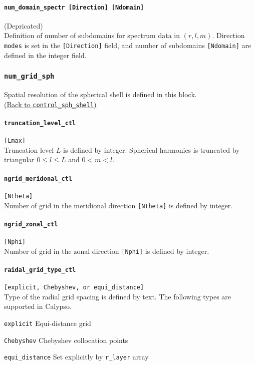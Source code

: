 \paragraph{\color{magenta} \tt num\_domain\_spectr    [Direction]    [Ndomain]}
\label{href_t:num_domain_spectr}
{\color{magenta} (Depricated)}\\
Definition of number of subdomains for spectrum data in $(r, l, m)$. Direction {\tt  modes} is set in the \verb|[Direction]| field, and number of subdomains \verb|[Ndomain]| are defined in the integer field.


\subsubsection{\tt num\_grid\_sph}
\label{href_t:num_grid_sph}
Spatial resolution of the spherical shell is defined in this block. \\
\hyperref[href_i:num_grid_sph]{(Back to {\tt control\_sph\_shell})}

\paragraph{\tt truncation\_level\_ctl}
\label{href_t:truncation_level_ctl}
\verb|[Lmax]| \\
Truncation level $L$ is defined by integer. Spherical harmonics is truncated by triangular $0 \le l \le L$ and $0 <m < l$.

\paragraph{\tt ngrid\_meridonal\_ctl}
\label{href_t:ngrid_meridonal_ctl}
\verb|[Ntheta]| \\
Number of grid in the meridional direction \verb|[Ntheta]| is defined by integer.

\paragraph{\tt ngrid\_zonal\_ctl}
\label{href_t:ngrid_zonal_ctl}
\verb|[Nphi]| \\
Number of grid in the zonal direction \verb|[Nphi]| is defined by integer.

\paragraph{\tt raidal\_grid\_type\_ctl}
\label{href_t:radial_grid_type_ctl}
\verb|[explicit, Chebyshev, or equi_distance]| \\
Type of the radial grid spacing is defined by text. The following types are supported in Calypso.
%
\begin{description}
	\item{\tt explicit}  Equi-distance grid
	\item{\tt Chebyshev} Chebyshev collocation points
	\item{\tt equi\_distance} Set explicitly by \verb|r_layer| array
\end{description}
%

